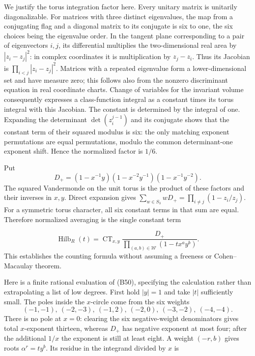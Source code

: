 \documentclass[
]{article}
\begin{document}
We justify the torus integration factor here. Every unitary matrix is
unitarily diagonalizable. For matrices with three distinct eigenvalues,
the map from a conjugating flag and a diagonal matrix to its conjugate
is six to one, the six choices being the eigenvalue order. In the
tangent plane corresponding to a pair of eigenvectors \(i,j\), its
differential multiplies the two-dimensional real area by
\(|z_i-z_j|^2\): in complex coordinates it is multiplication by
\(z_j-z_i\). Thus its Jacobian is \(\prod_{i<j}|z_i-z_j|^2\). Matrices
with a repeated eigenvalue form a lower-dimensional set and have measure
zero; this follows also from the nonzero discriminant equation in real
coordinate charts. Change of variables for the invariant volume
consequently expresses a class-function integral as a constant times its
torus integral with this Jacobian. The constant is determined by the
integral of one. Expanding the determinant \(\det(z_i^{j-1})\) and its
conjugate shows that the constant term of their squared modulus is six:
the only matching exponent permutations are equal permutations, modulo
the common determinant-one exponent shift. Hence the normalized factor
is \(1/6\).

Put \[
D_+=(1-x^{-1}y)(1-x^{-2}y^{-1})(1-x^{-1}y^{-2}).
\] The squared Vandermonde on the unit torus is the product of these
factors and their inverses in \(x,y\). Direct expansion gives
\(\sum_{w\in S_3}wD_+=\prod_{i\ne j}(1-z_i/z_j)\). For a symmetric torus
character, all six constant terms in that sum are equal. Therefore
normalized averaging is the single constant term
\protect{}\label{equation-B50}{}

\[
\operatorname{Hilb}_R(t)=\operatorname{CT}_{x,y}
\frac{D_+}{\prod_{(a,b)\in\mathcal W}(1-tx^ay^b)}.
\tag{B50}
\] This establishes the counting formula without assuming a freeness or
Cohen--Macaulay theorem.

Here is a finite rational evaluation of (B50), specifying the
calculation rather than extrapolating a list of low degrees. First hold
\(|y|=1\) and take \(|t|\) sufficiently small. The poles inside the
\(x\)-circle come from the six weights \[
(-1,-1),\ (-2,-3),\ (-1,2),\ (-2,0),\ (-3,-2),\ (-4,-4).
\] There is no pole at \(x=0\): clearing the six negative-weight
denominators gives total \(x\)-exponent thirteen, whereas \(D_+\) has
negative exponent at most four; after the additional \(1/x\) the
exponent is still at least eight. A weight \((-r,b)\) gives roots
\(\alpha^r=ty^b\). Its residue in the integrand divided by \(x\) is
\protect{}\label{equation-B51}{}
\end{document}
